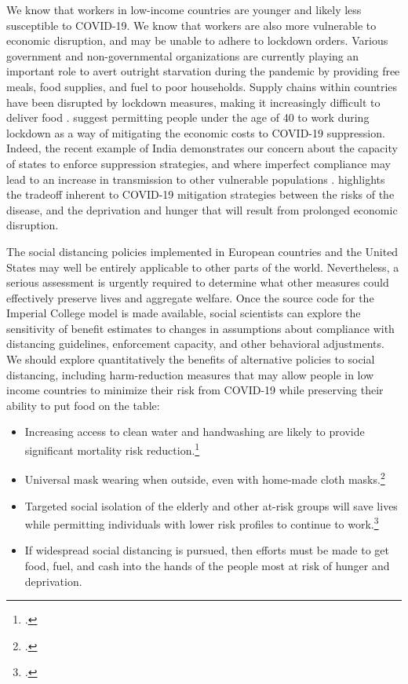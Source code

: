 \documentclass[11pt]{article}
\begin{document}
We know that workers in low-income countries are younger and likely less susceptible to COVID-19. We know that workers are also more vulnerable to economic disruption, and may be unable to adhere to lockdown orders. Various government and non-governmental organizations are currently playing an important role to avert outright starvation during the pandemic by providing free meals, food supplies, and fuel to poor households. Supply chains within countries have been disrupted by lockdown measures, making it increasingly difficult to deliver food \parencite{purohit2020}. \textcite{ray2020} suggest permitting people under the age of 40 to work during lockdown as a way of mitigating the economic costs to COVID-19 suppression. Indeed, the recent example of India demonstrates our concern about the capacity of states to enforce suppression strategies, and where imperfect compliance may lead to an increase in transmission to other vulnerable populations \parencite{scroll2020}. \textcite{ravallion2020} highlights the tradeoff inherent to COVID-19 mitigation strategies between the risks of the disease, and the deprivation and hunger that will result from prolonged economic disruption. 

The social distancing policies implemented in European countries and the United States may well be entirely applicable to other parts of the world. Nevertheless, a serious assessment is urgently required to determine what other measures could effectively preserve lives and aggregate welfare. Once the source code for the Imperial College model is made available, social scientists can explore the sensitivity of benefit estimates to changes in assumptions about compliance with distancing guidelines, enforcement capacity, and other behavioral adjustments. We should explore quantitatively the benefits of alternative policies to social distancing, including harm-reduction measures that may allow people in low income countries to minimize their risk from COVID-19 while preserving their ability to put food on the table:

\begin{itemize}
    \item Increasing access to clean water and handwashing are likely to provide significant mortality risk reduction.\footcite{glassman2020}
    \item Universal mask wearing when outside, even with home-made cloth masks.\footcite{abaluck2020}
    \item Targeted social isolation of the elderly and other at-risk groups will save lives while permitting individuals with lower risk profiles to continue to work.\footcite{lshtm2020, favas2020}
    \item If widespread social distancing is pursued, then efforts must be made to get food, fuel, and cash into the hands of the people most at risk of hunger and deprivation.
\end{itemize}
\end{document}
